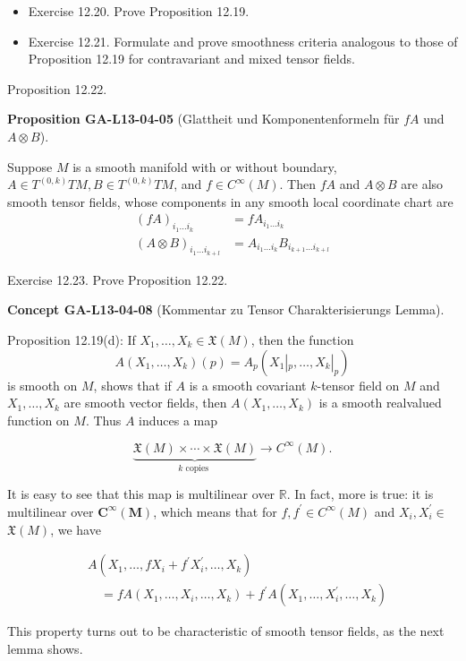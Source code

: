 \documentclass[10pt, letterpaper]{article}
\newcommand{\CustomHeading}[3]{%
  \par\medskip\noindent%
  \textbf{#1 #2} \textnormal{(#3)}.\enskip%
}
\newenvironment{PROP}[2]{\begin{unitbox}\CustomHeading{Proposition}{#1}{#2}}{\end{unitbox}}
\newenvironment{CONC}[2]{\begin{unitbox}\CustomHeading{Concept}{#1}{#2}}{\end{unitbox}}
\begin{document}
\begin{itemize}
  \item Exercise 12.20. Prove Proposition 12.19.
  \item Exercise 12.21. Formulate and prove smoothness criteria analogous to those of Proposition 12.19 for contravariant and mixed tensor fields.
\end{itemize}

Proposition 12.22. 

\begin{PROP}{GA-L13-04-05}{Glattheit und Komponentenformeln für $f A$ und $A \otimes B$}
Suppose $M$ is a smooth manifold with or without boundary, $A \in T^{(0, k)} T M, B \in T^{(0, k)} T M$, and $f \in C^{\infty}(M)$. Then $f A$ and $A \otimes B$ are also smooth tensor fields, whose components in any smooth local coordinate chart are
$$
\begin{aligned}
(f A)_{i_{1} \ldots i_{k}} & =f A_{i_{1} \ldots i_{k}} \\
(A \otimes B)_{i_{1} \ldots i_{k+l}} & =A_{i_{1} \ldots i_{k}} B_{i_{k+1} \ldots i_{k+l}}
\end{aligned}
$$
\end{PROP}

Exercise 12.23. Prove Proposition 12.22.\\



\begin{CONC}{GA-L13-04-08}{Kommentar zu Tensor Charakterisierungs Lemma}
Proposition 12.19(d): If $X_1, \ldots, X_k \in \mathfrak{X}(M)$, then the function 
  \[
  A(X_1, \ldots, X_k)(p) = A_p(X_1|_p, \ldots, X_k|_p)
  \]
is smooth on $M$, shows that if $A$ is a smooth covariant $k$-tensor field on $M$ and $X_{1}, \ldots, X_{k}$ are smooth vector fields, then $A\left(X_{1}, \ldots, X_{k}\right)$ is a smooth realvalued function on $M$. Thus $A$ induces a map

$$
\underbrace{\mathfrak{X}(M) \times \cdots \times \mathfrak{X}(M)}_{k \text { copies }} \rightarrow C^{\infty}(M) .
$$

It is easy to see that this map is multilinear over $\mathbb{R}$. In fact, more is true: it is multilinear over $\boldsymbol{C}^{\infty}(\boldsymbol{M})$, which means that for $f, f^{\prime} \in C^{\infty}(M)$ and $X_{i}, X_{i}^{\prime} \in$ $\mathfrak{X}(M)$, we have

$$
\begin{aligned}
& A\left(X_{1}, \ldots, f X_{i}+f^{\prime} X_{i}^{\prime}, \ldots, X_{k}\right) \\
& \quad=f A\left(X_{1}, \ldots, X_{i}, \ldots, X_{k}\right)+f^{\prime} A\left(X_{1}, \ldots, X_{i}^{\prime}, \ldots, X_{k}\right)
\end{aligned}
$$

This property turns out to be characteristic of smooth tensor fields, as the next lemma shows.
\end{CONC}
\end{document}
